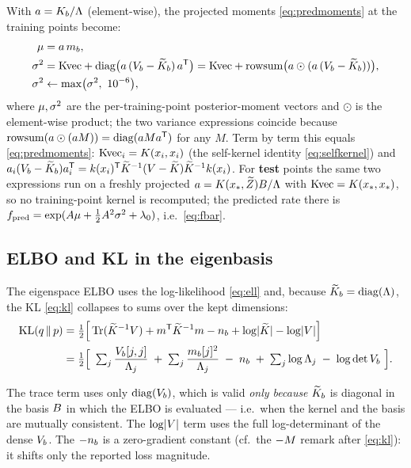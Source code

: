With $a=K_b/\Lambda$ (element-wise), the projected moments
\eqref{eq:predmoments} at the training points become:
\begin{align}
  \mu &= a\,m_{b}, \notag\\
  \sigma^{2}  &= \mathrm{Kvec} + \operatorname{diag}\!\big(a\,(V_{b}-\widetilde{K}_{b})\,a^{\mathsf{T}}\big)
          = \mathrm{Kvec} + \operatorname{rowsum}\!\big(a\odot(a\,(V_{b}-\widetilde{K}_{b}))\big), \notag\\
  \sigma^{2}  &\leftarrow \max\!\big(\sigma^{2},\ 10^{-6}\big),
  \label{eq:eigmoments}
\end{align}
where $\mu,\sigma^{2}$ are the per-training-point posterior-moment vectors and
$\odot$ is the element-wise product; the two variance expressions coincide
because $\operatorname{rowsum}(a\odot(a M))=\operatorname{diag}(a Ma^{\mathsf{T}})$
for any $M$. Term by term this equals \eqref{eq:predmoments}: $\mathrm{Kvec}_i=K(x_i,x_i)$
(the self-kernel identity \eqref{eq:selfkernel}) and
$a_i(V_{b}-\widetilde{K}_{b})a_i^{\mathsf{T}}=k(x_i)^{\mathsf{T}}\widetilde{K}^{-1}(V-\widetilde{K})\widetilde{K}^{-1}k(x_i)$.
For \textbf{test} points the same two expressions run on a freshly projected
$a=K(x_\ast,\widetilde{Z})B/\Lambda$ with $\mathrm{Kvec}=K(x_\ast,x_\ast)$, so no
training-point kernel is recomputed; the predicted rate there is
$f_{\mathrm{pred}}=\exp(A\mu+\tfrac12A^2\sigma^{2}+\lambda_{0})$, i.e.\
\eqref{eq:fbar}.

\subsection{ELBO and KL in the eigenbasis}\label{sec:eig-kl}

The eigenspace ELBO uses the log-likelihood \eqref{eq:ell} and, because
$\widetilde{K}_{b}=\operatorname{diag}(\Lambda)$, the KL \eqref{eq:kl} collapses to sums over the kept
dimensions:
\begin{align}
  \mathrm{KL}(q\,\|\,p)
    &= \tfrac12\Big[\operatorname{Tr}(\widetilde{K}^{-1}V)+m^{\mathsf{T}}\widetilde{K}^{-1}m-n_{b}
        +\log\lvert\widetilde{K}\rvert-\log\lvert V\rvert\Big] \notag\\
    &= \tfrac12\Big[\ \textstyle\sum_j \dfrac{V_{b}[j,j]}{\Lambda_j}
        \;+\; \sum_j \dfrac{m_{b}[j]^2}{\Lambda_j}
        \;-\; n_{b}
        \;+\; \sum_j \log\Lambda_j
        \;-\; \log\det V_{b}\ \Big].
  \label{eq:eigkl}
\end{align}

\begin{remark}
The trace term uses only $\operatorname{diag}(V_{b})$, which is valid \emph{only because}
$\widetilde{K}_{b}$ is diagonal in the basis $B$ in which the ELBO is evaluated --- i.e.\
when the kernel and the basis are mutually consistent. The $\log\lvert V\rvert$
term uses the full log-determinant of the dense $V_{b}$. The $-n_{b}$ is a
zero-gradient constant (cf.\ the $-M$ remark after \eqref{eq:kl}): it shifts
only the reported loss magnitude.
\end{remark}
